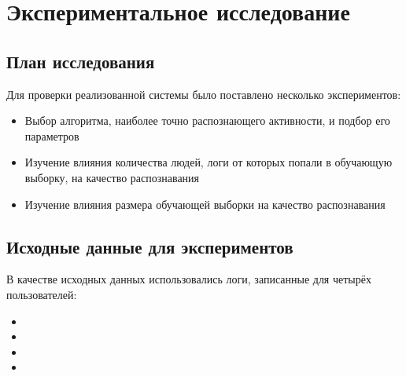 
\chapter{Экспериментальное исследование}

\section{План исследования}

Для проверки реализованной системы было поставлено несколько экспериментов:

\begin{itemize}
\item Выбор алгоритма, наиболее точно распознающего активности, и подбор его параметров
\item Изучение влияния количества людей, логи от которых попали в обучающую выборку, на качество распознавания 
\item Изучение влияния размера обучающей выборки на качество распознавания
\end{itemize}


\section{Исходные данные для экспериментов}

В качестве исходных данных использовались логи, записанные для четырёх пользователей:

\begin{itemize}
\item
\item
\item
\item 
\end{itemize}









